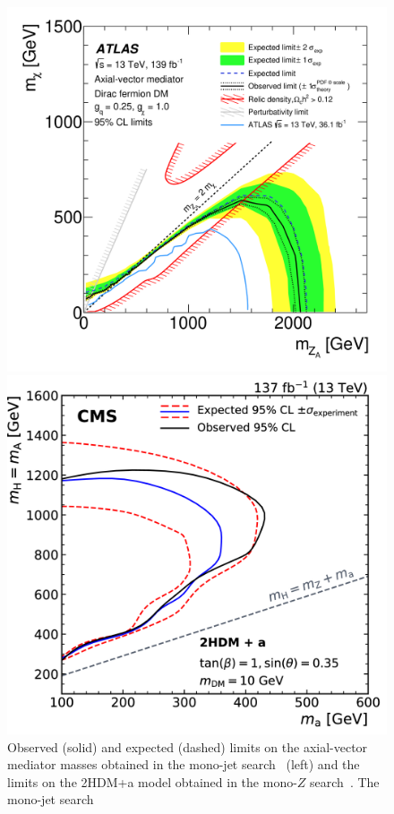\documentclass{moriond}
\begin{document}
\begin{figure} [htb]
\begin{minipage}{0.45\linewidth}
\centerline{\includegraphics[width=0.9\linewidth]{monojet}}
\end{minipage}
\begin{minipage}{0.45\linewidth}
\centerline{\includegraphics[width=0.9\linewidth]{monoz}}
\end{minipage}
\caption[]{Observed (solid) and expected (dashed) limits on the axial-vector mediator masses obtained in the mono-jet search~\cite{monojet} (left) and the limits on the 2HDM+a model obtained in the mono-$Z$ search~\cite{monoz}. The mono-jet search }
\label{fig:mono_jet_z}
\end{figure}
\end{document}
